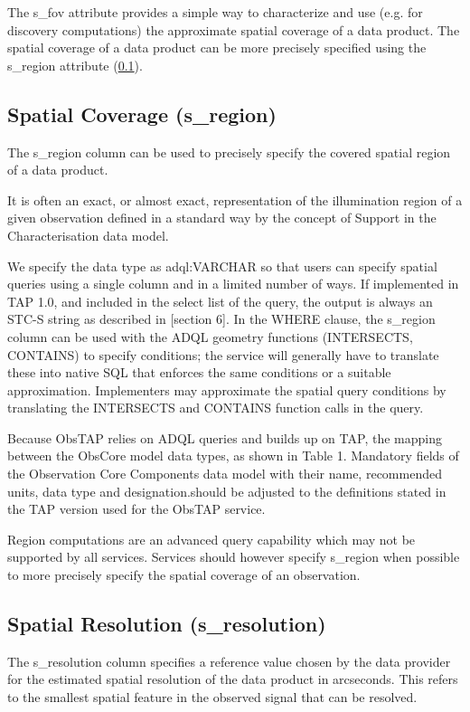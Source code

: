 \documentclass[11pt,a4paper]{ivoa}
\begin{document}
The s\_fov attribute provides a simple way to characterize and use (e.g. for discovery computations) the approximate
spatial coverage of a data product.  The spatial coverage of a data product can be more precisely specified using the
s\_region attribute (\ref{bkm:Ref158024378}).

\subsection{Spatial Coverage (s\_region)}
\label{bkm:Ref158024378}The s\_region column can be used to precisely specify the covered spatial region of a data
product. 

It is often an exact, or almost exact, representation of the illumination region of a given observation defined in a
standard way by the concept of Support in the Characterisation data model.

We specify the data type as adql:VARCHAR so that users can specify spatial queries using a single column and in a
limited number of ways. If implemented in TAP 1.0, and  included in the select list of the query, the output is always
an STC-S string as described in \citep{2010ivoa.spec.0327D} [section 6]. In the WHERE clause, the s\_region column can be
used with the ADQL geometry functions (INTERSECTS, CONTAINS) to specify conditions; the service will generally have to
translate these into native SQL that enforces the same conditions or a suitable approximation. Implementers may
approximate the spatial query conditions by translating the INTERSECTS and CONTAINS function calls in the query. 

Because ObsTAP relies on ADQL queries and builds up on TAP, the mapping between the ObsCore model data types, as shown
in Table 1.  Mandatory fields of the Observation Core Components data model with their name, recommended units, data
type and designation.should be adjusted to the definitions stated in the TAP version used for the ObsTAP service. 

Region computations are an advanced query capability which may not be supported by all services.  Services should
however specify s\_region when possible to more precisely specify the spatial coverage of an observation.

\subsection{Spatial Resolution (s\_resolution)}
The s\_resolution column specifies a reference value chosen by the data provider for the estimated spatial resolution of
the data product in arcseconds. This refers to the smallest spatial feature in the observed signal that can be
resolved.
\end{document}
